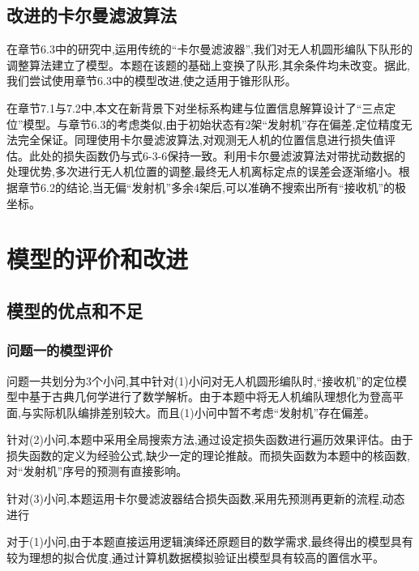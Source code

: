 \documentclass[withoutpreface,bwprint]{cumcmthesis} %
\begin{document}
		\subsection{改进的卡尔曼滤波算法}	
		
		
			在章节6.3中的研究中,运用传统的“卡尔曼滤波器”,我们对无人机圆形编队下队形的调整算法建立了模型。本题在该题的基础上变换了队形,其余条件均未改变。据此,我们尝试使用章节6.3中的模型改进,使之适用于锥形队形。
			
			在章节7.1与7.2中,本文在新背景下对坐标系构建与位置信息解算设计了“三点定位”模型。与章节6.3的考虑类似,由于初始状态有2架“发射机”存在偏差,定位精度无法完全保证。同理使用卡尔曼滤波算法,对观测无人机的位置信息进行损失值评估。此处的损失函数仍与式6-3-6保持一致。利用卡尔曼滤波算法对带扰动数据的处理优势,多次进行无人机位置的调整,最终无人机离标定点的误差会逐渐缩小。根据章节6.2的结论,当无偏“发射机”多余4架后,可以准确不搜索出所有“接收机”的极坐标。
				
	\section{模型的评价和改进}
	
		\subsection{模型的优点和不足}	
	
			\subsubsection{问题一的模型评价}
				
					
					问题一共划分为3个小问,其中针对(1)小问对无人机圆形编队时,“接收机”的定位模型中基于古典几何学进行了数学解析。由于本题中将无人机编队理想化为登高平面,与实际机队编排差别较大。而且(1)小问中暂不考虑“发射机”存在偏差。
					
					针对(2)小问,本题中采用全局搜索方法,通过设定损失函数进行遍历效果评估。由于损失函数的定义为经验公式,缺少一定的理论推敲。而损失函数为本题中的核函数,对“发射机”序号的预测有直接影响。
					
					针对(3)小问,本题运用卡尔曼滤波器结合损失函数,采用先预测再更新的流程,动态进行
			
				
					对于(1)小问,由于本题直接运用逻辑演绎还原题目的数学需求,最终得出的模型具有较为理想的拟合优度,通过计算机数据模拟验证出模型具有较高的置信水平。
					
\end{document}
